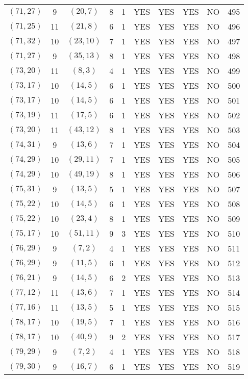 \begin{longtable}{|c|c|c|c|c|c|c|c|c|c|}
$(71, 27)$ & 9 & $(20, 7)$ & 8 & 1 & YES & YES & YES & NO & 495\\
$(71, 25)$ & 11 & $(21, 8)$ & 6 & 1 & YES & YES & YES & NO & 496\\
$(71, 32)$ & 10 & $(23, 10)$ & 7 & 1 & YES & YES & YES & NO & 497\\
$(71, 27)$ & 9 & $(35, 13)$ & 8 & 1 & YES & YES & YES & NO & 498\\
$(73, 20)$ & 11 & $(8, 3)$ & 4 & 1 & YES & YES & YES & NO & 499\\
$(73, 17)$ & 10 & $(14, 5)$ & 6 & 1 & YES & YES & YES & NO & 500\\
$(73, 17)$ & 10 & $(14, 5)$ & 6 & 1 & YES & YES & YES & NO & 501\\
$(73, 19)$ & 11 & $(17, 5)$ & 6 & 1 & YES & YES & YES & NO & 502\\
$(73, 20)$ & 11 & $(43, 12)$ & 8 & 1 & YES & YES & YES & NO & 503\\
$(74, 31)$ & 9 & $(13, 6)$ & 7 & 1 & YES & YES & YES & NO & 504\\
$(74, 29)$ & 10 & $(29, 11)$ & 7 & 1 & YES & YES & YES & NO & 505\\
$(74, 29)$ & 10 & $(49, 19)$ & 8 & 1 & YES & YES & YES & NO & 506\\
$(75, 31)$ & 9 & $(13, 5)$ & 5 & 1 & YES & YES & YES & NO & 507\\
$(75, 22)$ & 10 & $(14, 5)$ & 6 & 1 & YES & YES & YES & NO & 508\\
$(75, 22)$ & 10 & $(23, 4)$ & 8 & 1 & YES & YES & YES & NO & 509\\
$(75, 17)$ & 10 & $(51, 11)$ & 9 & 3 & YES & YES & YES & NO & 510\\
$(76, 29)$ & 9 & $(7, 2)$ & 4 & 1 & YES & YES & YES & NO & 511\\
$(76, 29)$ & 9 & $(11, 5)$ & 6 & 1 & YES & YES & YES & NO & 512\\
$(76, 21)$ & 9 & $(14, 5)$ & 6 & 2 & YES & YES & YES & NO & 513\\
$(77, 12)$ & 11 & $(13, 6)$ & 7 & 1 & YES & YES & YES & NO & 514\\
$(77, 16)$ & 11 & $(13, 5)$ & 5 & 1 & YES & YES & YES & NO & 515\\
$(78, 17)$ & 10 & $(19, 5)$ & 7 & 1 & YES & YES & YES & NO & 516\\
$(78, 17)$ & 10 & $(40, 9)$ & 9 & 2 & YES & YES & YES & NO & 517\\
$(79, 29)$ & 9 & $(7, 2)$ & 4 & 1 & YES & YES & YES & NO & 518\\
$(79, 30)$ & 9 & $(16, 7)$ & 6 & 1 & YES & YES & YES & NO & 519\\

\end{longtable}
